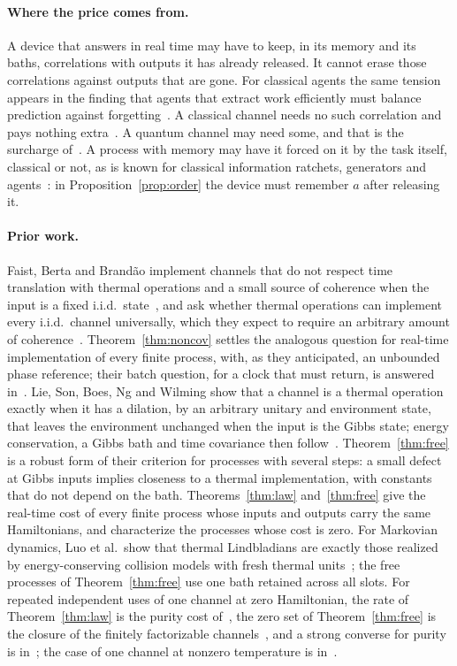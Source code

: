\documentclass[11pt]{article}
\theoremstyle{definition}
\theoremstyle{remark}
\begin{document}
\paragraph{Where the price comes from.} A device that answers in real time may have to keep, in its memory and its baths, correlations with outputs it has already released. It cannot erase those correlations against outputs that are gone. For classical agents the same tension appears in the finding that agents that extract work efficiently must balance prediction against forgetting~\cite{Fiderer26}. A classical channel needs no such correlation and pays nothing extra~\cite{SaveWork}. A quantum channel may need some, and that is the surcharge of~\cite{SaveWork}. A process with memory may have it forced on it by the task itself, classical or not, as is known for classical information ratchets, generators and agents~\cite{BMC18,LoomisCrutchfield20,Thompson25,Fiderer26}: in Proposition~\ref{prop:order} the device must remember $a$ after releasing it.

\paragraph{Prior work.} Faist, Berta and Brand\~ao implement channels that do not respect time translation with thermal operations and a small source of coherence when the input is a fixed i.i.d.\ state~\cite[Sec.~8.2]{FBB21}, and ask whether thermal operations can implement every i.i.d.\ channel universally, which they expect to require an arbitrary amount of coherence~\cite[Sec.~9]{FBB21}. Theorem~\ref{thm:noncov} settles the analogous question for real-time implementation of every finite process, with, as they anticipated, an unbounded phase reference; their batch question, for a clock that must return, is answered in~\cite{KeepingTime}. Lie, Son, Boes, Ng and Wilming show that a channel is a thermal operation exactly when it has a dilation, by an arbitrary unitary and environment state, that leaves the environment unchanged when the input is the Gibbs state; energy conservation, a Gibbs bath and time covariance then follow~\cite[Def.~1, Lemma~3, Prop.~4]{LieEtAl26}. Theorem~\ref{thm:free} is a robust form of their criterion for processes with several steps: a small defect at Gibbs inputs implies closeness to a thermal implementation, with constants that do not depend on the bath. Theorems~\ref{thm:law} and~\ref{thm:free} give the real-time cost of every finite process whose inputs and outputs carry the same Hamiltonians, and characterize the processes whose cost is zero. For Markovian dynamics, Luo et al.\ show that thermal Lindbladians are exactly those realized by energy-conserving collision models with fresh thermal units~\cite{LuoTrinity26}; the free processes of Theorem~\ref{thm:free} use one bath retained across all slots. For repeated independent uses of one channel at zero Hamiltonian, the rate of Theorem~\ref{thm:law} is the purity cost of~\cite{ClosedMemory}, the zero set of Theorem~\ref{thm:free} is the closure of the finitely factorizable channels~\cite{Memory}, and a strong converse for purity is in~\cite{Flagship}; the case of one channel at nonzero temperature is in~\cite{SaveWork}.
\end{document}
